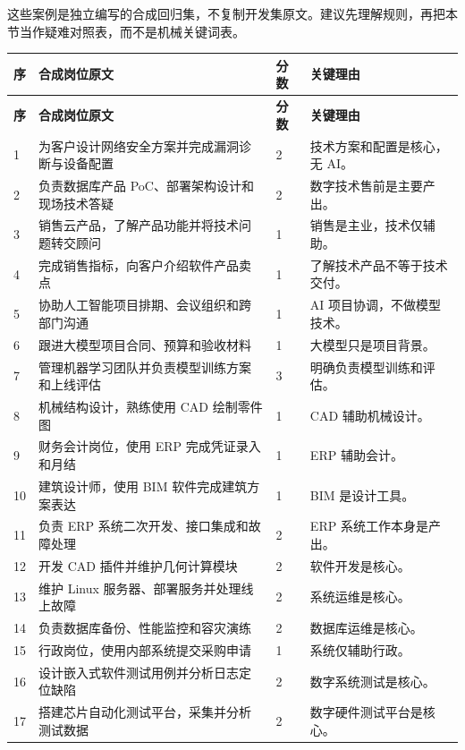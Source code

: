 \documentclass[11pt,a4paper,fontset=none]{ctexart}
\begin{document}
这些案例是独立编写的合成回归集，不复制开发集原文。建议先理解规则，再把本节当作疑难对照表，而不是机械关键词表。

\small
\begin{longtable}{C{0.7cm}L{7.3cm}C{1.1cm}L{5.2cm}}
\toprule
{}\color{white}\textbf{序} & \color{white}\textbf{合成岗位原文} & \color{white}\textbf{分数} & \color{white}\textbf{关键理由}\\
\midrule
\endfirsthead
\toprule
{}\color{white}\textbf{序} & \color{white}\textbf{合成岗位原文} & \color{white}\textbf{分数} & \color{white}\textbf{关键理由}\\
\midrule
{} & 为客户设计网络安全方案并完成漏洞诊断与设备配置 & 2 & 技术方案和配置是核心，无 AI。\\
2 & 负责数据库产品 PoC、部署架构设计和现场技术答疑 & 2 & 数字技术售前是主要产出。\\
3 & 销售云产品，了解产品功能并将技术问题转交顾问 & 1 & 销售是主业，技术仅辅助。\\
4 & 完成销售指标，向客户介绍软件产品卖点 & 1 & 了解技术产品不等于技术交付。\\
5 & 协助人工智能项目排期、会议组织和跨部门沟通 & 1 & AI 项目协调，不做模型技术。\\
6 & 跟进大模型项目合同、预算和验收材料 & 1 & 大模型只是项目背景。\\
7 & 管理机器学习团队并负责模型训练方案和上线评估 & 3 & 明确负责模型训练和评估。\\
8 & 机械结构设计，熟练使用 CAD 绘制零件图 & 1 & CAD 辅助机械设计。\\
9 & 财务会计岗位，使用 ERP 完成凭证录入和月结 & 1 & ERP 辅助会计。\\
10 & 建筑设计师，使用 BIM 软件完成建筑方案表达 & 1 & BIM 是设计工具。\\
11 & 负责 ERP 系统二次开发、接口集成和故障处理 & 2 & ERP 系统工作本身是产出。\\
12 & 开发 CAD 插件并维护几何计算模块 & 2 & 软件开发是核心。\\
13 & 维护 Linux 服务器、部署服务并处理线上故障 & 2 & 系统运维是核心。\\
14 & 负责数据库备份、性能监控和容灾演练 & 2 & 数据库运维是核心。\\
15 & 行政岗位，使用内部系统提交采购申请 & 1 & 系统仅辅助行政。\\
16 & 设计嵌入式软件测试用例并分析日志定位缺陷 & 2 & 数字系统测试是核心。\\
17 & 搭建芯片自动化测试平台，采集并分析测试数据 & 2 & 数字硬件测试平台是核心。\\

\end{longtable}
\end{document}
